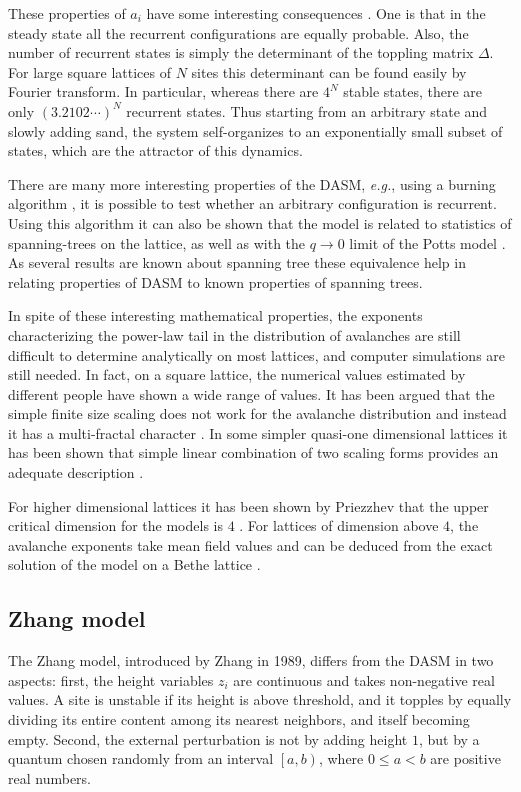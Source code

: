 \documentclass[11pt,a4paper]{book}
\begin{document}
These properties of $a_{i}$ have some interesting
consequences \cite{dharprl}. One is that in the steady state all the recurrent
configurations are equally probable. Also, the number of recurrent
states is simply the determinant of the toppling matrix
$\Delta$. For large square lattices of $N$ sites this determinant can be
found easily by Fourier transform. In particular, whereas there are
$4^N$ stable states, there are only $\left( 3.2102\cdots
\right)^{N}$ recurrent states. Thus starting from an arbitrary state
and slowly adding sand, the system self-organizes to an exponentially small
subset of states, which are the attractor of this dynamics.

There are many more interesting properties of the DASM,
\textit{e.g.}, using a burning algorithm \cite{burning}, it is
possible to test whether an arbitrary
configuration is recurrent. Using this
algorithm it can also be shown that the model is related to statistics
of spanning-trees
on the lattice, as well as with the $q\rightarrow 0$ limit of the
Potts model \cite{burning,dharphysica06}. As several results are
known about spanning tree these equivalence help in relating properties
of DASM to known properties of spanning trees.

In spite of these interesting mathematical properties, the exponents
characterizing the power-law tail in the distribution of
avalanches are still difficult to
determine analytically on most lattices, and computer
simulations are still needed. In fact, on a square lattice, the
numerical values estimated by different people have shown a wide range
of values. It has been argued that the simple finite size scaling does
not work for the avalanche distribution and instead it has a
multi-fractal character \cite{kadanoff}. In some simpler quasi-one dimensional
lattices it has been shown that simple linear combination of two
scaling forms provides an adequate description \cite{ali}.

For higher dimensional lattices it has been shown by Priezzhev that
the upper critical dimension for the models is $4$ \cite{ucd}. For
lattices of dimension above
$4$, the avalanche exponents take mean field values and can be deduced
from the exact solution of the model on a Bethe lattice
\cite{bethe}.


\subsection{Zhang model}
The Zhang model, introduced by Zhang in 1989, differs from the DASM in
two aspects: first, the height variables $z_{i}$ are continuous and
takes non-negative real values. A site is unstable if its height is above threshold, and
it topples by equally dividing its entire content among
its nearest neighbors, and itself becoming empty. Second, the external
perturbation is not by adding height $1$, but by a quantum chosen randomly
from an interval $\left[ a,b \right)$, where $0\le a < b$ are
positive real numbers.
\end{document}
